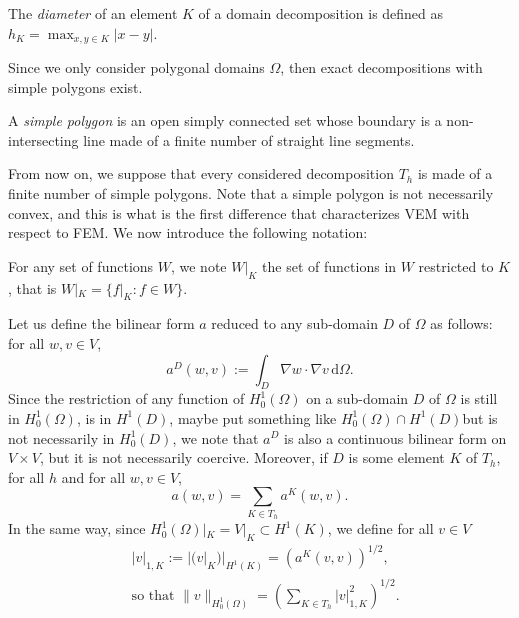 \begin{definition}[Diameter]
The \textit{diameter} of an element $K$ of a domain decomposition is defined as $h_K = \max_{x,y\in K}|x-y|$. 
\end{definition}

\noindent Since we only consider polygonal domains $\Omega$, then exact decompositions with simple polygons exist. 

\begin{definition}
A \textit{simple polygon} is an open simply connected set whose boundary is a non-intersecting line made of a finite number of straight line segments. 
\end{definition}

\noindent From now on, we suppose that every considered decomposition $T_h$ is made of a finite number of simple polygons. Note that a simple polygon is not necessarily convex, and this is what is the first difference that {\color{red}characterizes} VEM with respect to FEM. We now introduce the following notation: 
\begin{notation}
For any set of functions $W$, we note $W|_K$ the set of functions in $W$ restricted to $K$, that is $W|_K = \{f|_K : f\in W\}$. 
\end{notation}

\noindent Let us define the bilinear form $a$ reduced to any sub-domain $D$ of $\Omega$ as follows: for all $w,v\in V$,
$$ a^D(w,v) := \int_D \nabla w \cdot \nabla v \, \mathrm{d}\Omega. $$
Since the restriction of any function of $H_0^1(\Omega)$ on a sub-domain $D$ of $\Omega$ is still in $H_0^1(\Omega)$, is in $H^1(D)$, {\color{red} maybe put something like $H_0^1(\Omega) \cap H^1(D)$}but is not necessarily in $H_0^1(D)$, we note that $a^D$ is also a continuous bilinear form on $V\times V$, but it is not necessarily coercive. Moreover, if $D$ is some element $K$ of $T_h$, for all $h$ and for all $w,v\in V$, \begin{equation}\label{aKvsa}
a(w,v) = \sum_{K\in T_h} a^K(w,v).
\end{equation}
In the same way, since $H_0^1(\Omega)|_K = V|_K \subset H^1(K)$, we define for all $v\in V$
\begin{align}
&|v|_{1, K} := |(v|_K)|_{H^1(K)} = \left( a^K\left( v,v \right)\right)^{1/2}, \label{def1Knorm}\\
&\text{so that } \|v\|_{H_0^1(\Omega)} = \left(\sum_{K\in T_h} |v|_{1,K}^2\right)^{1/2}.\label{H01normsplit}
\end{align} 

